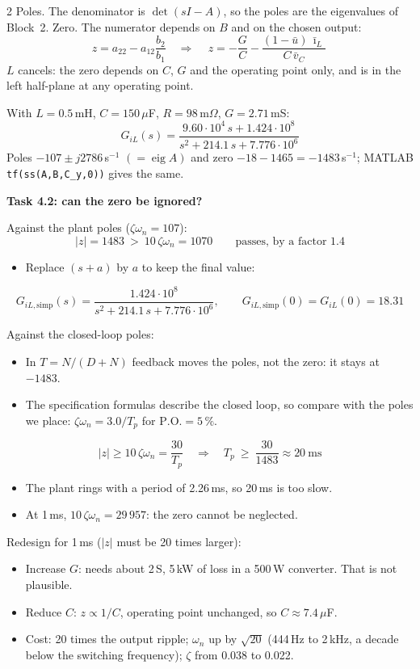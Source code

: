\documentclass[8pt]{extarticle}
\newcounter{psec}
\newcommand{\psection}[1]{%
  \refstepcounter{psec}\vspace{5pt}%
  \colorbox{ntnu}{\parbox{\dimexpr\linewidth-2\fboxsep}{%
    \color{white}\sffamily\bfseries\large\thepsec\quad #1}}\par\vspace{2pt}}
\newcommand{\PO}{\mathrm{P.O.}}
\newcommand{\zwn}{\zeta\omega_n}
\newcommand{\ub}{\bar u}
\newcommand{\ib}{\bar\imath_L}
\newcommand{\vb}{\bar v_C}
\begin{document}
\begin{multicols}{2}
Poles. The denominator is $\det(sI-A)$, so the poles are the
eigenvalues of Block~2.
Zero. The numerator depends on $B$ and on the chosen output:
\[
z=a_{22}-a_{12}\frac{b_2}{b_1}
\quad\Longrightarrow\quad
\boxed{\,z=-\frac{G}{C}-\frac{(1-\ub)\,\ib}{C\,\vb}\,}
\]
$L$ cancels: the zero depends on $C$, $G$ and the operating point only, and
is in the left half-plane at any operating point.

With $L=0.5$\,mH, $C=150\,\mu$F, $R=98$\,m$\Omega$, $G=2.71$\,mS:
\[
G_{iL}(s)=\frac{9.60\cdot10^{4}\,s+1.424\cdot10^{8}}{s^2+214.1\,s+7.776\cdot10^{6}}
\]
Poles $-107\pm j2786$\,s$^{-1}$ $(=\operatorname{eig}A)$ and zero
$-18-1465=-1483$\,s$^{-1}$; MATLAB \texttt{tf(ss(A,B,C\_y,0))} gives the same.

\psection{Task 4.2: can the zero be ignored?}

Against the plant poles ($\zwn=107$):
\[
|z|=1483\ >\ 10\,\zwn=1070 \qquad\text{passes, by a factor 1.4}
\]
\begin{itemize}
\item Replace $(s+a)$ by $a$ to keep the final value:
\end{itemize}
\[
G_{iL,\mathrm{simp}}(s)=\frac{1.424\cdot10^{8}}{s^2+214.1\,s+7.776\cdot10^{6}},
\qquad
G_{iL,\mathrm{simp}}(0)=G_{iL}(0)=18.31
\]

Against the closed-loop poles:
\begin{itemize}
\item In $T=N/(D+N)$ feedback moves the poles, not the zero: it stays at $-1483$.
\item The specification formulas describe the closed loop, so compare with the
  poles we place: $\zwn=3.0/T_p$ for $\PO=5\,\%$.
\end{itemize}

\begin{keybox}
\[
|z|\ge10\,\zwn=\frac{30}{T_p}
\quad\Longrightarrow\quad
T_p\ \ge\ \frac{30}{1483}\approx 20\ \text{ms}
\]
\end{keybox}

\begin{itemize}
\item The plant rings with a period of 2.26\,ms, so 20\,ms is too slow.
\item At 1\,ms, $10\,\zwn=29\,957$: the zero cannot be neglected.
\end{itemize}

Redesign for 1\,ms ($|z|$ must be 20 times larger):
\begin{itemize}
\item Increase $G$: needs about 2\,S, 5\,kW of loss in a 500\,W
  converter. That is not plausible.
\item Reduce $C$: $z\propto1/C$, operating point unchanged, so
  $C\approx7.4\,\mu$F.
\item Cost: 20 times the output ripple; $\omega_n$ up by $\sqrt{20}$
  (444\,Hz to 2\,kHz, a decade below the switching frequency); $\zeta$ from
  0.038 to 0.022.
\end{itemize}


\end{multicols}
\end{document}
